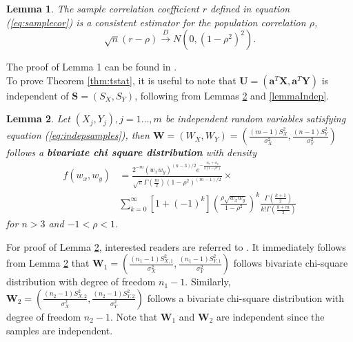 \documentclass[12pt, a4paper]{article}
\newtheorem{lemma}{Lemma}
\begin{document}
	\begin{lemma}
		The sample correlation coefficient $r$ defined in equation (\ref{eq:samplecor}) is a consistent estimator for the population correlation $\rho$, 
		\[\sqrt{n}(r - \rho ) \stackrel{D}{\rightarrow}N\left(0, (1-\rho^2)^2\right).\]
	\end{lemma}
	The proof of Lemma 1 can be found in \citet{fisher1915frequency}. \\
	
	To prove Theorem \ref{thm:tstat}, it is useful to note that $\bm U = (\bm a^T\bm X, \bm a^T\bm Y)$ is independent of $\bm S = (S_X, S_Y)$,
	following from Lemmas \ref{lemmabiChisq} and \ref{lemmaIndep}.
	\begin{lemma}\label{lemmabiChisq}
		Let $(X_{j}, Y_{j}), j=1 \ldots,  m$ be independent random variables satisfying equation 
		(\ref{eq:indepsamples}),
		then $\bm W = (W_{X},W_{Y}) =(\frac{(m -1)S_{X}^2}{\sigma_X^2}, 
		\frac{(n-1)S_{Y}^2}{\sigma_Y^2})$ 
		follows a \textbf{bivariate chi square distribution} with density 
		\begin{equation}\label{biChisq}
			\begin{aligned}
				f(w_x, w_y) & = \frac{2^{-m}(w_xw_y)^{(n-3)/2}e^{-\frac{w_x +
							w_y}{2(1-\rho^2)}}}{\sqrt{\pi}\Gamma(\frac{m}{2})(1-\rho^2)^{(m-1)/2}} 
							\times \\
				& \sum_{k=0}^{\infty}[1 +
				(-1)^k]\left(\frac{\rho\sqrt{w_xw_y}}{1-\rho^2}\right)^k\frac{\Gamma(\frac{k+1}{2})}{k!\Gamma(\frac{k+
				 m}{2})}
			\end{aligned}
		\end{equation}
		for $n>3$ and $-1<\rho < 1$.
	\end{lemma}
	For proof of Lemma \ref{lemmabiChisq}, interested readers are referred to \citet{joarder2009moments}.
	It immediately follows from Lemma \ref{lemmabiChisq} that $\bm W_1 = (\frac{(n_1 -1)S_{X, 1}^2}{\sigma_X^2}, \frac{(n_1-1)S_{Y, 1}^2}{\sigma_Y^2})$ follows bivariate chi-square distribution with degree of freedom $n_1-1$. Similarly, $\bm W_2 =(\frac{(n_2 -1)S_{X, 2}^2}{\sigma_X^2}, \frac{(n_2-1)S_{Y, 2}^2}{\sigma_Y^2})$ follows a bivariate chi-square distribution with degree of freedom $n_2-1$.  Note that $\bm W_1$ and $\bm W_2$ are independent since the samples are independent. 
	
\end{document}
